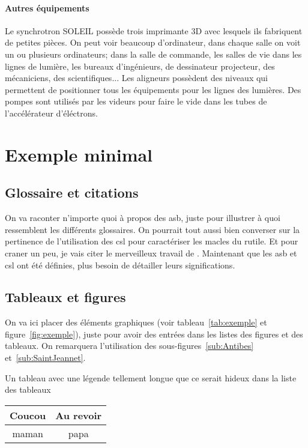 			\paragraph{Autres équipements}
				Le synchrotron SOLEIL possède trois imprimante 3D avec lesquels ils fabriquent de petites pièces. On peut voir beaucoup d'ordinateur, dans chaque salle on voit un ou plusieurs ordinateurs; dans la salle de commande, les salles de vie dans les lignes de lumière, les bureaux d'ingénieurs, de dessinateur projecteur, des mécaniciens, des scientifiques... Les aligneurs possèdent des niveaux qui permettent de positionner tous les équipements pour les lignes des lumières. Des pompes sont utilisés par les videurs pour faire le vide dans les tubes de l'accélérateur d'éléctrons.



\section{Exemple minimal}
	\subsection{Glossaire et citations}
		On va raconter n'importe quoi à propos des \gls{asb}, juste pour illustrer à quoi ressemblent les différents glossaires. On pourrait tout aussi bien converser sur la pertinence de l'utilisation des \gls{csl} pour caractériser les \glspl{macle} du \gls{rutile}. Et pour craner un peu, je vais citer le merveilleux travail de \citet{depriester2014thermomechanical}. Maintenant que les \gls{asb} et \gls{csl} ont été définies, plus besoin de détailler leurs significations.
		
	\subsection{Tableaux et figures}
	On va ici placer des éléments graphiques (voir tableau~\ref{tab:exemple} et figure~\ref{fig:exemple}), juste pour avoir des entrées dans les listes des figures et des tableaux. On remarquera l'utilisation des sous-figures~\ref{sub:Antibes} et~\ref{sub:SaintJeannet}.
	
	\begin{tableth}
		\caption[Légende courte pour l'exemple de tableau]{Un tableau avec une légende tellement longue que ce serait hideux dans la liste des tableaux}
			\label{tab:exemple}
		\begin{tabular}{c|c}
			Coucou	& Au revoir\\
			\hline
			maman	& papa
		\end{tabular}
	\end{tableth}

